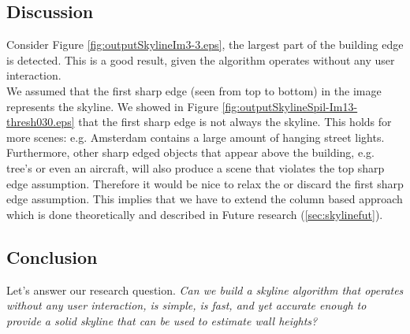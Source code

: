 \newpage
{}


\clearpage

\subsection{Discussion}  %
Consider Figure \ref{fig:outputSkylineIm3-3.eps}, the largest part of the
building edge is detected. This is a good result, given the algorithm
operates without any user interaction.\\

We assumed that the first sharp edge (seen from top to bottom) in the image 
represents the skyline. We showed in Figure \ref{fig:outputSkylineSpil-Im13-thresh030.eps}
that the first sharp edge is not always the skyline.
This holds for more scenes: e.g. Amsterdam contains a large amount of
hanging street lights.  Furthermore, other sharp edged objects that appear above
the building, e.g. tree's or even an aircraft, will also produce a scene that
violates the top sharp edge assumption.  Therefore it would be nice to relax the or discard the first sharp edge assumption.
This implies that we have to extend the column based approach which is done
theoretically and described in Future research (\ref{sec:skylinefut}).

\subsection{Conclusion}
Let's answer our research question.
\emph{Can we build a skyline algorithm that operates without any user interaction, is
simple, is fast, and yet accurate enough to provide a solid skyline that can be
used to estimate wall heights?}\\

